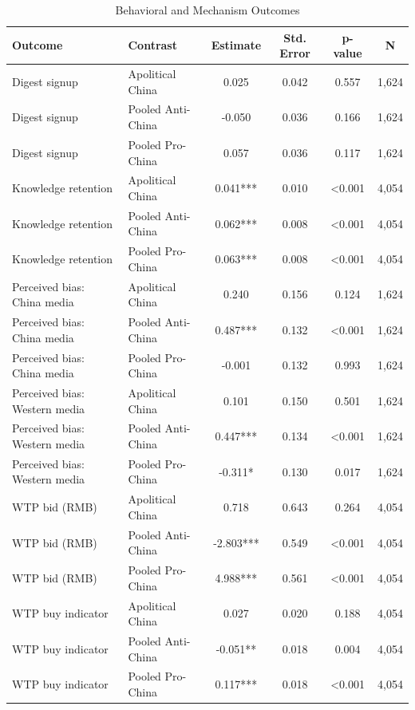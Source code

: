 \begin{table}[H]
\centering
\caption{Behavioral and Mechanism Outcomes}
\label{tab:behavioral_outcomes_t1_t2}
\footnotesize
\begin{threeparttable}
\begin{tabular}{llcccc}
\toprule
Outcome & Contrast & Estimate & Std. Error & p-value & N \\
\midrule
Digest signup & Apolitical China & 0.025 & 0.042 & 0.557 & 1,624 \\
Digest signup & Pooled Anti-China & -0.050 & 0.036 & 0.166 & 1,624 \\
Digest signup & Pooled Pro-China & 0.057 & 0.036 & 0.117 & 1,624 \\
Knowledge retention & Apolitical China & 0.041*** & 0.010 & <0.001 & 4,054 \\
Knowledge retention & Pooled Anti-China & 0.062*** & 0.008 & <0.001 & 4,054 \\
Knowledge retention & Pooled Pro-China & 0.063*** & 0.008 & <0.001 & 4,054 \\
Perceived bias: China media & Apolitical China & 0.240 & 0.156 & 0.124 & 1,624 \\
Perceived bias: China media & Pooled Anti-China & 0.487*** & 0.132 & <0.001 & 1,624 \\
Perceived bias: China media & Pooled Pro-China & -0.001 & 0.132 & 0.993 & 1,624 \\
Perceived bias: Western media & Apolitical China & 0.101 & 0.150 & 0.501 & 1,624 \\
Perceived bias: Western media & Pooled Anti-China & 0.447*** & 0.134 & <0.001 & 1,624 \\
Perceived bias: Western media & Pooled Pro-China & -0.311* & 0.130 & 0.017 & 1,624 \\
WTP bid (RMB) & Apolitical China & 0.718 & 0.643 & 0.264 & 4,054 \\
WTP bid (RMB) & Pooled Anti-China & -2.803*** & 0.549 & <0.001 & 4,054 \\
WTP bid (RMB) & Pooled Pro-China & 4.988*** & 0.561 & <0.001 & 4,054 \\
WTP buy indicator & Apolitical China & 0.027 & 0.020 & 0.188 & 4,054 \\
WTP buy indicator & Pooled Anti-China & -0.051** & 0.018 & 0.004 & 4,054 \\
WTP buy indicator & Pooled Pro-China & 0.117*** & 0.018 & <0.001 & 4,054 \\
\bottomrule
\end{tabular}
\begin{tablenotes}[flushleft]

\end{tablenotes}
\end{threeparttable}
\end{table}
